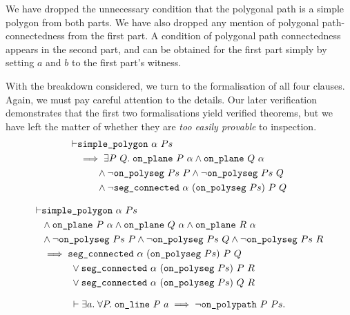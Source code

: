We have dropped the unnecessary condition that the polygonal path is a simple polygon from both parts. We have also dropped any mention of polygonal path-connectedness from the first part. A condition of polygonal path connectedness appears in the second part, and can be obtained for the first part simply by setting $a$ and $b$ to the first part's witness.

With the breakdown considered, we turn to the formalisation of all four clauses. Again, we must pay careful attention to the details. Our later verification demonstrates that the first two formalisations yield verified theorems, but we have left the matter of whether they are \emph{too easily provable} to inspection.
\begin{equation}\label{eq:jordanFormal1}
  \begin{split}
\vdash &\code{simple\_polygon}\ \alpha\ Ps\\
       &\implies \exists P\ Q.\; \code{on\_plane}\ P\ \alpha \wedge \code{on\_plane}\ Q\ \alpha\\
       &\qquad\wedge \neg\code{on\_polyseg}\ Ps\ P \wedge \neg\code{on\_polyseg}\ Ps\ Q\\
       &\qquad\wedge \neg\code{seg\_connected}\ \alpha\ (\code{on\_polyseg}\ Ps)\ P\ Q
  \end{split}
\end{equation}

\begin{equation}\label{eq:jordanFormal2}
  \begin{split}
\vdash &\code{simple\_polygon}\ \alpha\ Ps\\
       &\wedge \code{on\_plane}\ P\ \alpha \wedge \code{on\_plane}\ Q\ \alpha \wedge \code{on\_plane}\ R\ \alpha\\
       &\wedge \neg\code{on\_polyseg}\ Ps\ P\wedge \neg\code{on\_polyseg}\ Ps\ Q\wedge \neg\code{on\_polyseg}\ Ps\ R\\
       &\implies \code{seg\_connected}\ \alpha\ (\code{on\_polyseg}\ Ps)\ P\ Q\\
       &\qquad\quad\vee \code{seg\_connected}\ \alpha\ (\code{on\_polyseg}\ Ps)\ P\ R\\
       &\qquad\quad\vee \code{seg\_connected}\ \alpha\ (\code{on\_polyseg}\ Ps)\ Q\ R
     \end{split}
\end{equation}

\begin{equation}\label{eq:jordanFormal3}
  \begin{split}
    \vdash
    \exists a.\; \forall P.\; \texttt{on\_line}\ P\ a \implies \neg\texttt{on\_polypath}\ P\ Ps.
    \end{split}
\end{equation}

